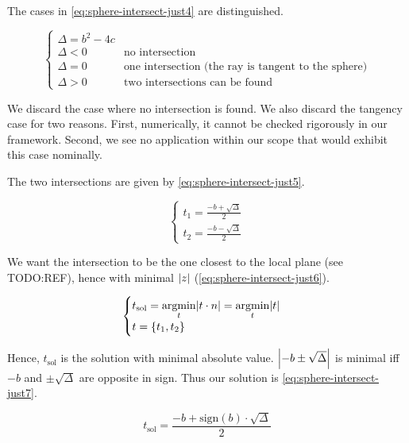 The cases in \cref{eq:sphere-intersect-just4} are distinguished.

\begin{equation} \label{eq:sphere-intersect-just4} \begin{cases}
\Delta = b^2 - 4c & \\
\Delta < 0 & \text{no intersection} \\
\Delta = 0 & \text{one intersection (the ray is tangent to the sphere)} \\
\Delta > 0 & \text{two intersections can be found}
\end{cases} \end{equation}

We discard the case where no intersection is found. We also discard
the tangency case for two reasons. First, numerically, it cannot be checked
rigorously in our framework. Second, we see no application within our scope
that would exhibit this case nominally.

The two intersections are given by \cref{eq:sphere-intersect-just5}.

\begin{equation} \label{eq:sphere-intersect-just5} \begin{cases}
t_1 = \frac{-b + \sqrt{\Delta}}{2} \\
t_2 = \frac{-b - \sqrt{\Delta}}{2}
\end{cases} \end{equation}

We want the intersection to be the one closest to the local plane
(see TODO:REF), hence with minimal $\abs{z}$ (\cref{eq:sphere-intersect-just6}).

\begin{equation} \label{eq:sphere-intersect-just6} \begin{cases}
t_\textrm{sol} = \underset{t}{\mathrm{argmin}} \abs{t \cdot n} 
               = \underset{t}{\mathrm{argmin}} \abs{t} \\
t = \{ t_1, t_2 \}
\end{cases} \end{equation}

Hence, $t_\textrm{sol}$ is the solution with minimal absolute value.
$\abs{-b \pm \sqrt{\Delta}}$ is minimal iff
$-b$ and $\pm \sqrt{\Delta}$ are opposite in sign. Thus our
solution is \cref{eq:sphere-intersect-just7}.

\begin{equation} \label{eq:sphere-intersect-just7}
t_\textrm{sol} = \frac{-b + \textrm{sign}(b) \cdot \sqrt{\Delta}}{2}
\end{equation}

